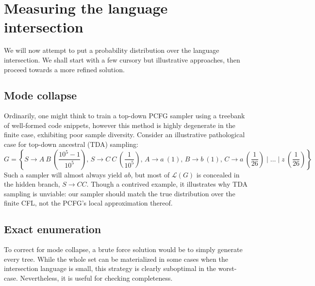 \documentclass[popl.tex]{subfiles}
\begin{document}
\section{Measuring the language intersection}\label{sec:measurement}

We will now attempt to put a probability distribution over the language intersection. We shall start with a few cursory but illustrative approaches, then proceed towards a more refined solution.

\subsection{Mode collapse}

Ordinarily, one might think to train a top-down PCFG sampler using a treebank of well-formed code snippets, however this method is highly degenerate in the finite case, exhibiting poor sample diversity. Consider an illustrative pathological case for top-down ancestral (TDA) sampling:
\[
G=\left\{ S \rightarrow A\:B \: \left(\frac{10^5 - 1}{10^5}\right), \hspace{2pt}
     S \rightarrow C\:C \: \left(\frac{1}{10^5}\right), \hspace{2pt}
     A \rightarrow a \: (1), \hspace{2pt}
     B  \rightarrow b \: (1), \hspace{2pt}
     C  \rightarrow a \: \left(\frac{1}{26}\right) \mid \ldots \mid z \: \left(\frac{1}{26}\right)\right\}
\]
Such a sampler will almost always yield $a b$, but most of $\mathcal{L}(G)$ is concealed in the hidden branch, $S \rightarrow C C$. Though a contrived example, it illustrates why TDA sampling is unviable: our sampler should match the true distribution over the finite CFL, not the PCFG's local approximation thereof.

\subsection{Exact enumeration}

To correct for mode collapse, a brute force solution would be to simply generate every tree. While the whole set can be materialized in some cases when the intersection language is small, this strategy is clearly suboptimal in the worst-case. Nevertheless, it is useful for checking completeness.
\end{document}
